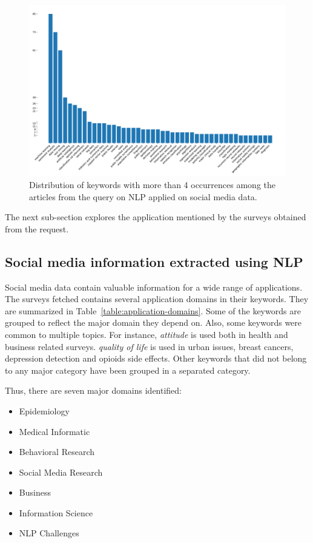\begin{figure}[htb]
    \centering
    \includegraphics[width=\textwidth]{figures/chap-2/nlp-bar.pdf}
    \caption{Distribution of keywords with more than 4 occurrences among the articles from the query on NLP applied on social media data.}
    \label{literature:nlp-bar}
\end{figure}

The next sub-section explores the application mentioned by the surveys obtained from the request.

\subsection{Social media information extracted using NLP}
Social media data contain valuable information for a wide range of applications.
The surveys fetched contains several application domains in their keywords.
They are summarized in Table~\ref{table:application-domains}.
Some of the keywords are grouped to reflect the major domain they depend on.
Also, some keywords were common to multiple topics.
For instance, \emph{attitude} is used both in health and business related surveys.
\emph{quality of life} is used in urban issues, breast cancers, depression detection and opioids side effects.
Other keywords that did not belong to any major category have been grouped in a separated category.

Thus, there are seven major domains identified:

\begin{itemize}
    \item Epidemiology
    \item Medical Informatic
    \item Behavioral Research
    \item Social Media Research
    \item Business
    \item Information Science
    \item NLP Challenges
\end{itemize}

